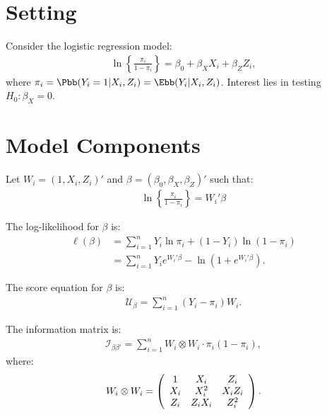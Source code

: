 




\section{Setting}
Consider the logistic regression model:
\begin{align*}
\ln\left\{\frac{\pi_{i}}{1 - \pi_{i}}\right\} = \beta_{0} + \beta_{X}X_{i} + \beta_{Z}Z_{i},
\end{align*}
where $\pi_{i} = \Pbb(Y_{i} = 1 | X_{i}, Z_{i}) = \Ebb(Y_{i} | X_{i}, Z_{i})$. Interest lies in testing $H_{0}: \beta_{X} = 0$. 

\section{Model Components}
Let $W_{i} = (1, X_{i}, Z_{i})'$ and $\beta = (\beta_{0}, \beta_{X}, \beta_{Z})'$ such that:
\begin{align*}
\ln\left\{\frac{\pi_{i}}{1 - \pi_{i}}\right\} = W_{i}'\beta
\end{align*}

The log-likelihood for $\beta$ is:
\begin{align*}
\ell(\beta) &= \sum_{i=1}^{n}Y_{i} \ln \pi_{i} + (1 - Y_{i}) \ln (1 - \pi_{i}) \\
&= \sum_{i=1}^{n} Y_{i} e^{W_{i}'\beta} - \ln(1 + e^{W_{i}'\beta}).
\end{align*}

The score equation for $\beta$ is:
\begin{align*}
\mathcal{U}_{\beta} = \sum_{i=1}^{n}(Y_{i} - \pi_{i})W_{i}.
\end{align*}

The information matrix is:
\begin{align*}
\mathcal{I}_{\beta\beta'} = \sum_{i=1}^{n}W_{i} \otimes W_{i} \cdot \pi_{i}(1 - \pi_{i}),
\end{align*}
where:
\begin{align*}
W_{i} \otimes W_{i} = \left(
\begin{array}{c c c}
1 & X_{i} & Z_{i} \\
X_{i} & X_{i}^2 & X_{i}Z_{i} \\
Z_{i} & Z_{i}X_{i} & Z_{i}^{2}
\end{array}
\right).
\end{align*}


